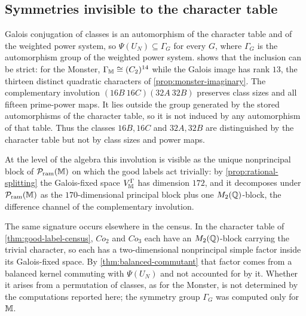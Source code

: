 \subsection{Symmetries invisible to the character table}
\label{sec:invisible-symmetries}

Galois conjugation of classes is an automorphism of the character table
and of the weighted power system, so \(\Psi(U_N)\subseteq\Gamma_G\) for
every \(G\), where \(\Gamma_G\) is the automorphism group of the weighted
power system.   shows that the
inclusion can be strict: for the Monster, \(\Gamma_{\mathbb M}\cong(C_2)^{14}\)
while the Galois image has rank \(13\), the thirteen distinct quadratic
characters of \cref{prop:monster-imaginary}.  The complementary involution
\((16B\ 16C)(32A\ 32B)\) preserves class sizes and all fifteen prime-power
maps.  It lies outside the group generated by the stored automorphisms of the
character table, so it is not induced by any automorphism of that table.
Thus the classes \(16B,16C\) and \(32A,32B\) are distinguished by the
character table but not by class sizes and power maps.

At the level of the algebra this involution is visible as the unique
nonprincipal block of \(\mathcal P_{\mathrm{ram}}(\mathbb M)\) on which the good labels act
trivially: by \cref{prop:rational-splitting} the Galois-fixed space
\(V_{\mathbb M}^{\Gamma}\) has dimension \(172\), and it decomposes under
\(\mathcal P_{\mathrm{ram}}(\mathbb M)\) as the \(170\)-dimensional principal block plus one
\(M_2(\mathbb Q)\)-block, the difference channel of the complementary involution.

The same signature occurs elsewhere in the census.  In the character table
of \cref{thm:good-label-census}, \(Co_2\) and \(Co_3\) each have an
\(M_2(\mathbb Q)\)-block carrying the trivial character, so each has a
two-dimensional nonprincipal simple factor inside its Galois-fixed space.
By \cref{thm:balanced-commutant} that factor comes from a balanced kernel
commuting with \(\Psi(U_N)\) and not accounted for by it.  Whether it
arises from a permutation of classes, as for the Monster, is not
determined by the computations reported here; the symmetry group
\(\Gamma_G\) was computed only for \(\mathbb M\).

